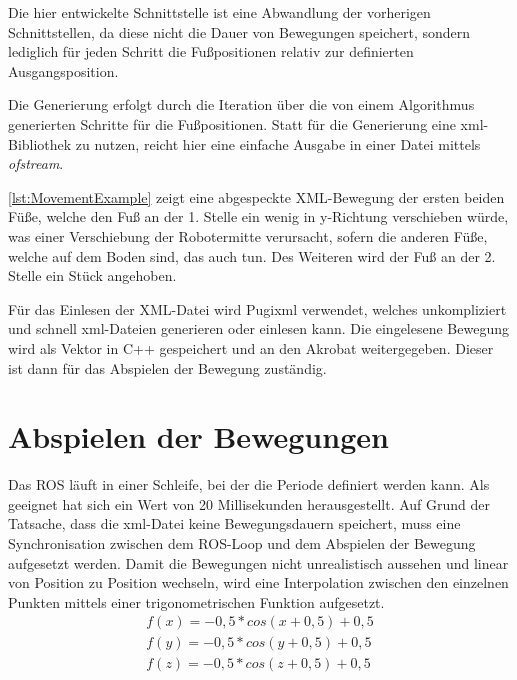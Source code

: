 \begin{itemize}
Die hier entwickelte Schnittstelle ist eine Abwandlung der vorherigen Schnittstellen, da diese nicht die Dauer von Bewegungen speichert, sondern lediglich für jeden Schritt die Fußpositionen relativ zur definierten Ausgangsposition.

Die Generierung erfolgt durch die Iteration über die von einem Algorithmus generierten Schritte für die Fußpositionen. Statt für die Generierung eine xml-Bibliothek zu nutzen, reicht hier eine einfache Ausgabe in einer Datei mittels \emph{ofstream}.

\autoref{lst:MovementExample} zeigt eine abgespeckte XML-Bewegung der ersten beiden Füße, welche den Fuß an der 1. Stelle ein wenig in y-Richtung verschieben würde, was einer Verschiebung der Robotermitte verursacht, sofern die anderen Füße, welche auf dem Boden sind, das auch tun. Des Weiteren wird der Fuß an der 2. Stelle ein Stück angehoben.

Für das Einlesen der XML-Datei wird Pugixml \autocite{pugixml} verwendet, welches unkompliziert und schnell xml-Dateien generieren oder einlesen kann. Die eingelesene Bewegung wird als Vektor in C++ gespeichert und an den Akrobat weitergegeben. Dieser ist dann für das Abspielen der Bewegung zuständig.



\section{Abspielen der Bewegungen}

Das \ac{ROS} läuft in einer Schleife, bei der die Periode definiert werden kann. Als geeignet hat sich ein Wert von 20 Millisekunden herausgestellt. Auf Grund der Tatsache, dass die xml-Datei keine Bewegungsdauern speichert, muss eine Synchronisation zwischen dem \ac{ROS}-Loop und dem Abspielen der Bewegung aufgesetzt werden. Damit die Bewegungen nicht unrealistisch aussehen und linear von Position zu Position wechseln, wird eine Interpolation zwischen den einzelnen Punkten mittels einer trigonometrischen Funktion aufgesetzt.
\begin{eqnarray}
\label{kap4:cosinterpolation}
f(x) = -0,5 * cos(x + 0,5) + 0,5 \\
\label{kap4:cosinterpolation2}
f(y) = -0,5 * cos(y + 0,5) + 0,5 \\
\label{kap4:cosinterpolation3}
f(z) = -0,5 * cos(z + 0,5) + 0,5
\end{eqnarray}


\end{itemize}
